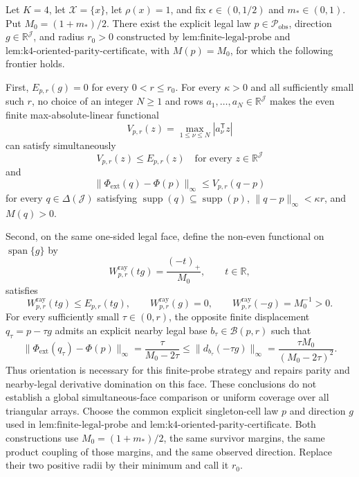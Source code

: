 Let \(K=4\), let \(\mathcal X=\{x\}\), let \(\rho(x)=1\), and fix \(\epsilon\in(0,1/2)\) and \(m_*\in(0,1)\).  Put \(M_0=(1+m_*)/2\).  There exist the explicit legal law \(p\in\mathcal P_{\mathrm{obs}}\), direction \(g\in\mathbb R^{\mathcal J}\), and radius \(r_0>0\) constructed by \(\text{lem:finite-legal-probe}\) and \(\text{lem:k4-oriented-parity-certificate}\), with \(M(p)=M_0\), for which the following frontier holds.

First, \(E_{p,r}(g)=0\) for every \(0<r\le r_0\).  For every \(\kappa>0\) and all sufficiently small such \(r\), no choice of an integer \(N\ge1\) and rows \(a_1,\ldots,a_N\in\mathbb R^{\mathcal J}\) makes the even finite max-absolute-linear functional
\[
 V_{p,r}(z)=\max_{1\le\nu\le N}|a_\nu^{\mathsf T}z|
\]
can satisfy simultaneously
\[
 V_{p,r}(z)\le E_{p,r}(z)\quad\text{for every }z\in\mathbb R^{\mathcal J}
\tag{P1}
\]
and
\[
 \|\Phi_{\mathrm{ext}}(q)-\Phi(p)\|_\infty
 \le V_{p,r}(q-p)
\tag{P2}
\]
for every \(q\in\Delta(\mathcal J)\) satisfying \(\operatorname{supp}(q)\subseteq\operatorname{supp}(p)\), \(\|q-p\|_\infty<\kappa r\), and \(M(q)>0\).

Second, on the same one-sided legal face, define the non-even functional on \(\operatorname{span}\{g\}\) by
\[
 W^{\mathrm{ray}}_{p,r}(tg)=\frac{(-t)_+}{M_0},\qquad t\in\mathbb R,
\]
satisfies
\[
 W^{\mathrm{ray}}_{p,r}(tg)\le E_{p,r}(tg),\qquad
 W^{\mathrm{ray}}_{p,r}(g)=0,
 \qquad
 W^{\mathrm{ray}}_{p,r}(-g)=M_0^{-1}>0.
\tag{P3}
\]
For every sufficiently small \(\tau\in(0,r)\), the opposite finite displacement \(q_\tau=p-\tau g\) admits an explicit nearby legal base \(b_\tau\in\mathcal B(p,r)\) such that
\[
 \|\Phi_{\mathrm{ext}}(q_\tau)-\Phi(p)\|_\infty
 =\frac{\tau}{M_0-2\tau}
 \le \|d_{b_\tau}(-\tau g)\|_\infty
 =\frac{\tau M_0}{(M_0-2\tau)^2}.
\tag{P4}
\]
Thus orientation is necessary for this finite-probe strategy and repairs parity and nearby-legal derivative domination on this face.  These conclusions do not establish a global simultaneous-face comparison or uniform coverage over all triangular arrays.
Choose the common explicit singleton-cell law \(p\) and direction \(g\) used in \(\text{lem:finite-legal-probe}\) and \(\text{lem:k4-oriented-parity-certificate}\).  Both constructions use \(M_0=(1+m_*)/2\), the same survivor margins, the same product coupling of those margins, and the same observed direction.  Replace their two positive radii by their minimum and call it \(r_0\).

